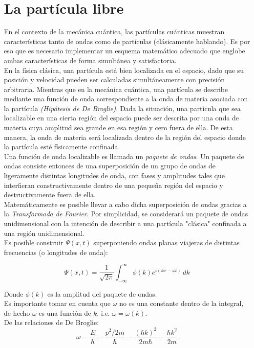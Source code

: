 \section{La partícula libre}
\label{La partícula libre}

En el contexto de la mecánica cuántica, las partículas cuánticas muestran características tanto de ondas como de 
partículas (clásicamente hablando). Es por eso que es necesario implementar un esquema matemático adecuado que englobe 
ambas características de forma simultánea y satisfactoria.\\
En la física clásica, una partícula está bien localizada en el espacio, dado que su posición y velocidad pueden ser 
calculadas simultáneamente con precisión arbitraria. Mientras que en la mecánica cuántica, una partícula se describe 
mediante una función de onda correspondiente a la onda de materia asociada con la partícula \emph{(Hipótesis de De Broglie)}. 
Dada la situación, una partícula que sea localizable en una cierta región del espacio puede ser descrita por una onda de materia 
cuya amplitud sea grande en esa región y cero fuera de ella. De esta manera, la onda de materia será localizada dentro 
de la región del espacio donde la partícula esté físicamente confinada.\\
Una función de onda localizable es llamada un \emph{paquete de ondas}. Un paquete de ondas consiste entonces de una 
superposición de un grupo de ondas de ligeramente distintas longitudes de onda, con fases y amplitudes tales que 
interfieran constructivamente dentro de una pequeña región del espacio y destructivamente fuera de ella.\\

Matemáticamente es posible llevar a cabo dicha superposición de ondas gracias a la \emph{Transformada de Fourier}. Por 
simplicidad, se considerará un paquete de ondas unidimensional con la intención de describir a una partícula "clásica" 
confinada a una región unidimensional.\\
Es posible construir $\Psi(x,t)$ superponiendo ondas planas viajeras de distintas frecuencias (o longitudes de onda):

\begin{equation}
    \Psi(x,t) = \frac{1}{\sqrt{2\pi}} \int_{-\infty}^{\infty} \phi(k)e^{i(kx-\omega t)}\,dk
\end{equation}

Donde $\phi(k)$ es la amplitud del paquete de ondas.\\
Es importante tomar en cuenta que $\omega$ no es una constante dentro de la integral, de hecho $\omega$ es una función de 
$k$, i.e. $\omega=\omega(k)$.\\
De las relaciones de De Broglie:
\begin{equation*}
    \omega = \frac{E}{\hbar} = \frac{p^2/2m}{\hbar} = \frac{(\hbar k)^2}{2m\hbar} = \frac{\hbar k^2}{2m}
\end{equation*}

